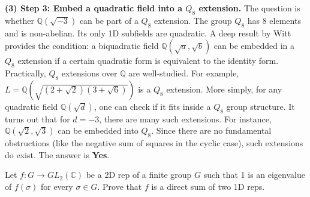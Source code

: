 \begin{solution}
\textbf{(3) Step 3: Embed a quadratic field into a $Q_8$ extension.}
The question is whether $\mathbb{Q}(\sqrt{-3})$ can be part of a $Q_8$ extension.
The group $Q_8$ has 8 elements and is non-abelian. Its only 1D subfields are quadratic.
A deep result by Witt provides the condition: a biquadratic field $\mathbb{Q}(\sqrt{a}, \sqrt{b})$ can be embedded in a $Q_8$ extension if a certain quadratic form is equivalent to the identity form.
Practically, $Q_8$ extensions over $\mathbb{Q}$ are well-studied. For example, $L = \mathbb{Q}(\sqrt{(2+\sqrt{2})(3+\sqrt{6})})$ is a $Q_8$ extension.
More simply, for any quadratic field $\mathbb{Q}(\sqrt{d})$, one can check if it fits inside a $Q_8$ group structure. It turns out that for $d = -3$, there are many such extensions. For instance, $\mathbb{Q}(\sqrt{2}, \sqrt{3})$ can be embedded into $Q_8$.
Since there are no fundamental obstructions (like the negative sum of squares in the cyclic case), such extensions do exist. The answer is \textbf{Yes}.
\end{solution}

\begin{exercise}
\label{algebra:2011:2}
Let $f: G \to GL_2(\mathbb{C})$ be a 2D rep of a finite group $G$ such that 1 is an eigenvalue of $f(\sigma)$ for every $\sigma \in G$. Prove that $f$ is a direct sum of two 1D reps.
\end{exercise}

